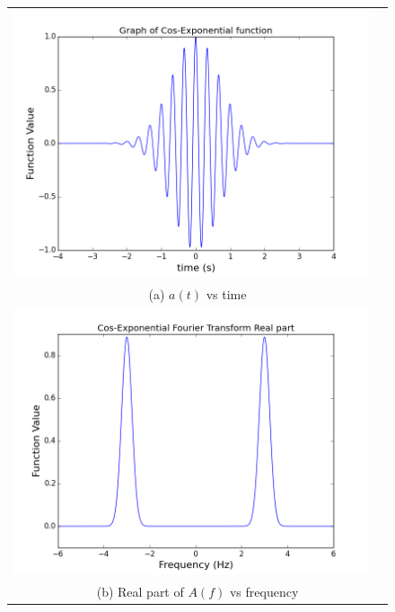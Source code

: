\documentclass[11pt]{article}
\begin{document}
\begin{figure}[H]
\centering
\begin{tabular}{cc}
\includegraphics[scale=.4]{cos_wavepacket.png} \\
\multicolumn{2}{c}{(a) $a(t)$ vs time} \\[6pt]

\includegraphics[scale=.4]{cos_fourReal.png}\\
\multicolumn{2}{c}{(b) Real part of $A(f)$ vs frequency} \\[6pt]


\end{tabular}
\end{figure}
\end{document}
